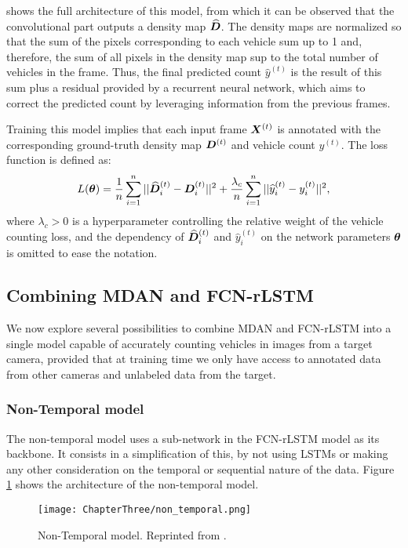  shows the full architecture of this model, from which it can be observed that the convolutional part outputs a density map $\widehat{{\bm{D}}}$. The density maps are normalized so that the sum of the pixels corresponding to each vehicle sum up to 1 and, therefore, the sum of all pixels in the density map sup to the total number of vehicles in the frame. Thus, the final predicted count $\widehat{y}^{(t)}$ is the result of this sum plus a residual provided by a recurrent neural network, which aims to correct the predicted count by leveraging information from the previous frames.

Training this model implies that each input frame ${\bm{X}}^{(t)}$ is annotated with the corresponding ground-truth density map ${\bm{D}}^{(t)}$ and vehicle count $y^{(t)}$. The loss function is defined as:
\begin{equation}
	L({\bm{\theta}}) = \frac{1}{n} \sum_{i=1}^{n} ||\widehat{{\bm{D}}}^{(t)}_i - {\bm{D}}^{(t)}_i||^2 + \frac{\lambda_c}{n} \sum_{i=1}^{n} ||\widehat{y}^{(t)}_i - y^{(t)}_i||^2,
\end{equation}
where $\lambda_c > 0$ is a hyperparameter controlling the relative weight of the vehicle counting loss, and the dependency of $\widehat{{\bm{D}}}^{(t)}_i$ and $\hat{y}^{(t)}_i$ on the network parameters ${\bm{\theta}}$ is omitted to ease the notation.

\subsection{Combining MDAN and FCN-rLSTM}
\label{sec:mdan_fcn_rlstm}
We now explore several possibilities to combine MDAN and FCN-rLSTM into a single model capable of accurately counting vehicles in images from a target camera, provided that at training time we only have access to annotated data from other cameras and unlabeled data from the target.

\subsubsection{Non-Temporal model}
The non-temporal model uses a sub-network in the FCN-rLSTM model as its backbone. It consists in a simplification of this, by not using LSTMs or making any other consideration on the temporal or sequential nature of the data. Figure \ref{fig:non_temporal_model} shows the architecture of the non-temporal model.

\begin{figure}[!ht]
	\centering
	\texttt{[image: ChapterThree/non\_temporal.png]}
	\caption{Non-Temporal model. Reprinted from \citet{ThesisFrancisco}.}
	\label{fig:non_temporal_model}
\end{figure}


